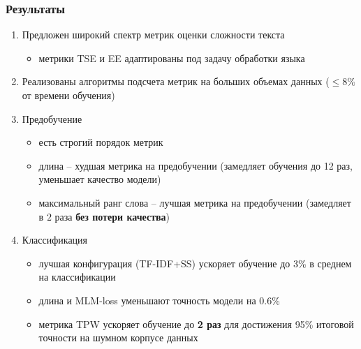 \documentclass{beamer}
\begin{document}
\begin{frame}
	\frametitle{Результаты}
	\begin{enumerate}
		\item Предложен широкий спектр метрик оценки сложности текста
		\begin{itemize}
			\item метрики TSE и EE адаптированы под задачу обработки языка
		\end{itemize}
		\item Реализованы алгоритмы подсчета метрик на больших объемах данных ($\le 8\%$ от времени обучения)
		\item Предобучение
			\begin{itemize}
				\item есть строгий порядок метрик
				\item длина -- худшая метрика на предобучении (замедляет обучения до 12 раз, уменьшает качество модели)
				\item максимальный ранг слова -- лучшая метрика на предобучении (замедляет в $2$ раза {\bf без потери качества})
			\end{itemize}
		\item Классификация
			\begin{itemize}
				\item лучшая конфигурация (TF-IDF+SS) ускоряет обучение до 3\% в среднем на классификации
				\item длина и MLM-loss уменьшают точность модели на 0.6\%
				\item 
				метрика TPW ускоряет обучение до {\bf 2 раз} для достижения 95\% итоговой точности на шумном корпусе данных
			\end{itemize}
	\end{enumerate}
\end{frame}

\appendix
\end{document}
